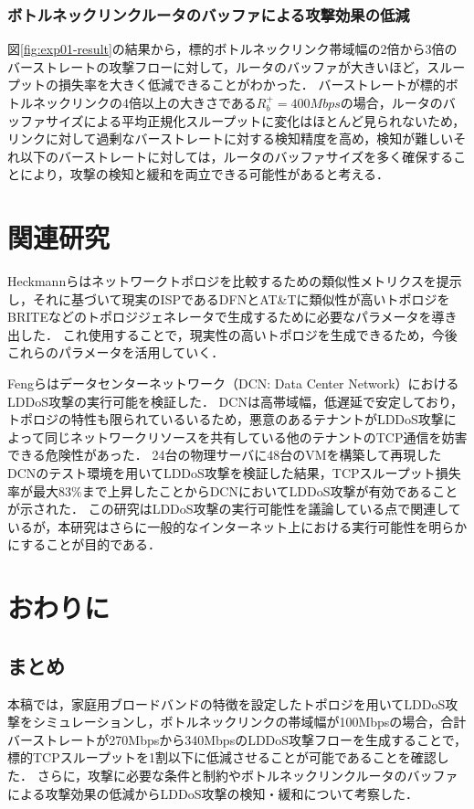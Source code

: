 \documentclass[Japanese]{dicomopapers}
\begin{document}
\subsubsection{ボトルネックリンクルータのバッファによる攻撃効果の低減}
図\ref{fig:exp01-result}の結果から，標的ボトルネックリンク帯域幅の2倍から3倍のバーストレートの攻撃フローに対して，ルータのバッファが大きいほど，スループットの損失率を大きく低減できることがわかった．
バーストレートが標的ボトルネックリンクの4倍以上の大きさである$R_{b}^+=400Mbps$の場合，ルータのバッファサイズによる平均正規化スループットに変化はほとんど見られないため，リンクに対して過剰なバーストレートに対する検知精度を高め，検知が難しいそれ以下のバーストレートに対しては，ルータのバッファサイズを多く確保することにより，攻撃の検知と緩和を両立できる可能性があると考える．

\section{関連研究}
Heckmannらはネットワークトポロジを比較するための類似性メトリクスを提示し，それに基づいて現実のISPであるDFNとAT\&Tに類似性が高いトポロジをBRITEなどのトポロジジェネレータで生成するために必要なパラメータを導き出した．
これ使用することで，現実性の高いトポロジを生成できるため，今後これらのパラメータを活用していく．

Fengらはデータセンターネットワーク（DCN: Data Center Network）におけるLDDoS攻撃の実行可能を検証した\cite{dcn-shrew}．
DCNは高帯域幅，低遅延で安定しており，トポロジの特性も限られているいるため，悪意のあるテナントがLDDoS攻撃によって同じネットワークリソースを共有している他のテナントのTCP通信を妨害できる危険性があった．
24台の物理サーバに48台のVMを構築して再現したDCNのテスト環境を用いてLDDoS攻撃を検証した結果，TCPスループット損失率が最大83\%まで上昇したことからDCNにおいてLDDoS攻撃が有効であることが示された．
この研究はLDDoS攻撃の実行可能性を議論している点で関連しているが，本研究はさらに一般的なインターネット上における実行可能性を明らかにすることが目的である．

\section{おわりに}
\subsection{まとめ}
本稿では，家庭用ブロードバンドの特徴を設定したトポロジを用いてLDDoS攻撃をシミュレーションし，ボトルネックリンクの帯域幅が100Mbpsの場合，合計バーストレートが270Mbpsから340MbpsのLDDoS攻撃フローを生成することで，標的TCPスループットを1割以下に低減させることが可能であることを確認した．
さらに，攻撃に必要な条件と制約やボトルネックリンクルータのバッファによる攻撃効果の低減からLDDoS攻撃の検知・緩和について考察した．
\end{document}
